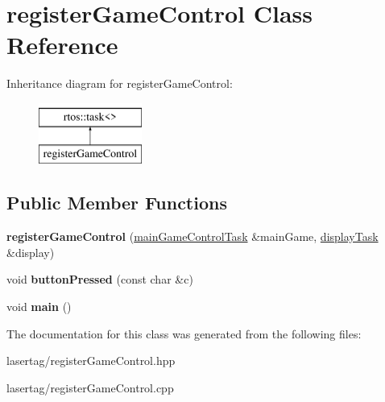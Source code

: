\hypertarget{classregister_game_control}{}\section{register\+Game\+Control Class Reference}
\label{classregister_game_control}
Inheritance diagram for register\+Game\+Control\+:\begin{figure}[H]
\begin{center}
\leavevmode
\includegraphics[height=2.000000cm]{classregister_game_control}
\end{center}
\end{figure}
\subsection*{Public Member Functions}
\begin{DoxyCompactItemize}
\item 
\mbox{\label{classregister_game_control_a90674e16d0a4ec52c71b9e29a64ee003}} 
{\bfseries register\+Game\+Control} (\mbox{\hyperlink{classmain_game_control_task}{main\+Game\+Control\+Task}} \&main\+Game, \mbox{\hyperlink{classdisplay_task}{display\+Task}} \&display)
\item 
\mbox{\label{classregister_game_control_a36671245dcea8853ebcc88446b974929}} 
void {\bfseries button\+Pressed} (const char \&c)
\item 
\mbox{\label{classregister_game_control_a4db3c71a142241827cc2e8444c25aeaa}} 
void {\bfseries main} ()
\end{DoxyCompactItemize}


The documentation for this class was generated from the following files\+:\begin{DoxyCompactItemize}
\item 
lasertag/register\+Game\+Control.\+hpp\item 
lasertag/register\+Game\+Control.\+cpp\end{DoxyCompactItemize}
